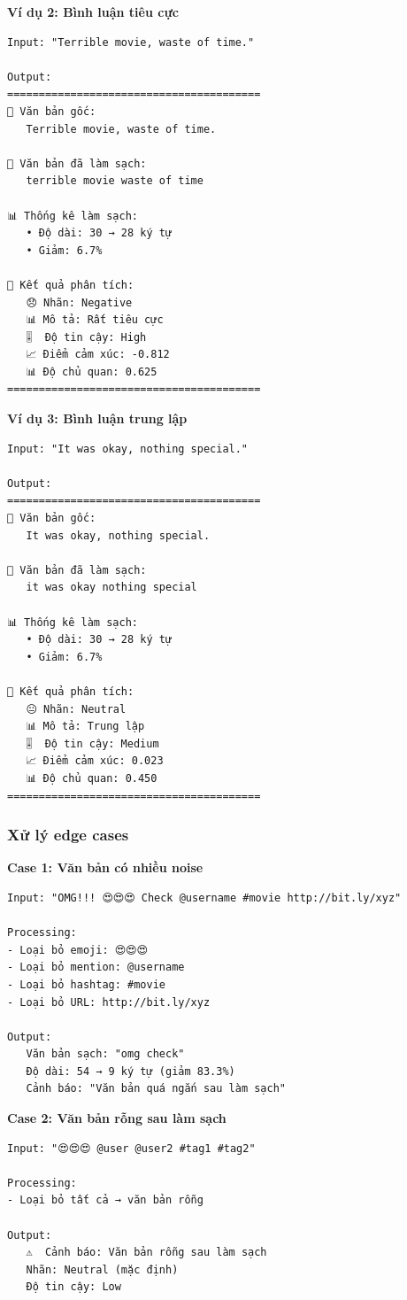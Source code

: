 \textbf{Ví dụ 2: Bình luận tiêu cực}
\begin{verbatim}
Input: "Terrible movie, waste of time."

Output:
========================================
📝 Văn bản gốc:
   Terrible movie, waste of time.

🧹 Văn bản đã làm sạch:
   terrible movie waste of time

📊 Thống kê làm sạch:
   • Độ dài: 30 → 28 ký tự
   • Giảm: 6.7%

🎯 Kết quả phân tích:
   😞 Nhãn: Negative
   📊 Mô tả: Rất tiêu cực
   🎚️  Độ tin cậy: High
   📈 Điểm cảm xúc: -0.812
   📊 Độ chủ quan: 0.625
========================================
\end{verbatim}

\textbf{Ví dụ 3: Bình luận trung lập}
\begin{verbatim}
Input: "It was okay, nothing special."

Output:
========================================
📝 Văn bản gốc:
   It was okay, nothing special.

🧹 Văn bản đã làm sạch:
   it was okay nothing special

📊 Thống kê làm sạch:
   • Độ dài: 30 → 28 ký tự
   • Giảm: 6.7%

🎯 Kết quả phân tích:
   😐 Nhãn: Neutral
   📊 Mô tả: Trung lập
   🎚️  Độ tin cậy: Medium
   📈 Điểm cảm xúc: 0.023
   📊 Độ chủ quan: 0.450
========================================
\end{verbatim}

\subsubsection{Xử lý edge cases}

\textbf{Case 1: Văn bản có nhiều noise}
\begin{verbatim}
Input: "OMG!!! 😍😍😍 Check @username #movie http://bit.ly/xyz"

Processing:
- Loại bỏ emoji: 😍😍😍
- Loại bỏ mention: @username
- Loại bỏ hashtag: #movie
- Loại bỏ URL: http://bit.ly/xyz

Output:
   Văn bản sạch: "omg check"
   Độ dài: 54 → 9 ký tự (giảm 83.3%)
   Cảnh báo: "Văn bản quá ngắn sau làm sạch"
\end{verbatim}

\textbf{Case 2: Văn bản rỗng sau làm sạch}
\begin{verbatim}
Input: "😍😍😍 @user @user2 #tag1 #tag2"

Processing:
- Loại bỏ tất cả → văn bản rỗng

Output:
   ⚠️  Cảnh báo: Văn bản rỗng sau làm sạch
   Nhãn: Neutral (mặc định)
   Độ tin cậy: Low
\end{verbatim}

